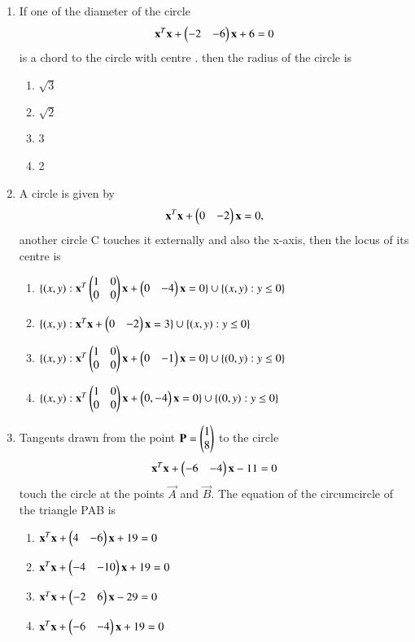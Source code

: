 \begin{enumerate}[label=\arabic*.,ref=\thesubsection.\theenumi]
\item If one of the diameter of the circle 
\begin{align}
\mathbf{x}^T\mathbf{x}+\begin{pmatrix}-2&-6\end{pmatrix}\mathbf{x}+6=0
\end{align} 
is a chord to the circle with centre . then the radius of the circle is 
\begin{enumerate}
\item $\sqrt{3}$
\item $\sqrt{2}$
\item 3
\item 2
\end{enumerate}
    
\item A circle is given by
\begin{align}
\mathbf{x}^T\mathbf{x}+\begin{pmatrix}0&-2\end{pmatrix}\mathbf{x}=0,
\end{align}
another circle C touches it externally and also the x-axis, then the locus of its centre is
\begin{enumerate}
\item $\{(x,y):\mathbf{x}^T\begin{pmatrix}1&0\\0&0\end{pmatrix}\mathbf{x} +\begin{pmatrix}0&-4\end{pmatrix} \mathbf{x}=0\} \cup \{(x,y):y \leq 0\}$
\item $\{(x,y): \mathbf{x}^T \mathbf{x} + \begin{pmatrix}0&-2\end{pmatrix} \mathbf{x}=3\} \cup  \{(x,y):y \leq 0\}$
\item $\{(x,y): \mathbf{x}^T \begin{pmatrix}1 & 0 \\ 0 & 0 \end{pmatrix}\mathbf{x} + \begin{pmatrix}0 & -1\end{pmatrix} \mathbf{x}=0\} \cup \{(0,y):y \leq 0\}$
\item $\{(x,y): \mathbf{x}^T \begin{pmatrix}1 & 0 \\ 0 & 0 \end{pmatrix} \mathbf{x} +\begin{pmatrix}0,-4\end{pmatrix}\mathbf{x}= 0\} \cup  \{(0,y):y \leq 0\}$
\end{enumerate}
    
\item Tangents drawn from the point $\mathbf{P}=\begin{pmatrix}1 \\ 8\end{pmatrix}$ to the circle 
\begin{align} 
\mathbf{x}^T\mathbf{x}+\begin{pmatrix}-6&-4\end{pmatrix}\mathbf{x}-11=0
\end{align}
touch the circle at the points $\vec{A}$ and $\vec{B}.$ The equation of the circumcircle of the triangle PAB is
\begin{enumerate}
\item $\mathbf{x}^T\mathbf{x}+\begin{pmatrix}4&-6\end{pmatrix}\mathbf{x}+19=0$
\item $\mathbf{x}^T\mathbf{x}+\begin{pmatrix}-4&-10\end{pmatrix}\mathbf{x}+19=0$
\item $\mathbf{x}^T\mathbf{x}+\begin{pmatrix}-2&6\end{pmatrix}\mathbf{x}-29=0$
\item $ \mathbf{x}^T\mathbf{x}+\begin{pmatrix}-6&-4\end{pmatrix}\mathbf{x}+19=0$ 
\end{enumerate}
    

\end{enumerate}
